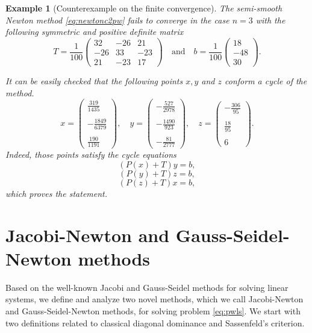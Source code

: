 \documentclass[11pt]{article}
\newtheorem{example}{Example}
\begin{document}
\begin{example}[Counterexample on the finite convergence]
The semi-smooth Newton method \eqref{eq:newtonc2pw} fails to converge in the case $n=3$ with the following symmetric and positive definite matrix
\begin{equation}\label{data-conter}
T = \frac{1}{100}
\left(\begin{matrix}
32 & -26 & 21\\
-26 & 33 & -23\\
21 & -23 & 17
\end{matrix}\right)
\quad 
\mbox{and}\quad 
b = \frac{1}{100}
\left(\begin{matrix}
18\\
-48\\
30
\end{matrix}\right).
\end{equation}

It can be easily checked that the following points $x,y$ and $z$ conform a cycle of the method.
\[
x =
\left(\begin{matrix}
\frac{319}{1435}\\
\\
-\frac{1849}{6379}\\
\\
\frac{190}{1191}
\end{matrix}\right)
,\quad 
y =
\left(\begin{matrix}
-\frac{527}{2978}\\
\\
-\frac{1490}{923}\\
\\
-\frac{81}{2777}
\end{matrix}\right)
, \quad 
z =
\left(\begin{matrix}
-\frac{306}{95}\\
\\
\frac{18}{95}\\
\\
6
\end{matrix}\right).
\]
Indeed, those points satisfy the cycle equations
$$ (P(x)+T)y=b,$$
$$ (P(y)+T)z=b,$$
$$ (P(z)+T)x=b,$$ which proves the statement.\end{example}

\section{Jacobi-Newton and Gauss-Seidel-Newton methods}

Based on the well-known Jacobi and Gauss-Seidel methods for solving linear systems, we define and analyze two novel methods, which we call Jacobi-Newton and Gauss-Seidel-Newton methods, for solving problem \eqref{eq:pwls}. We start with two definitions related to classical diagonal dominance and Sassenfeld's criterion.
\end{document}

